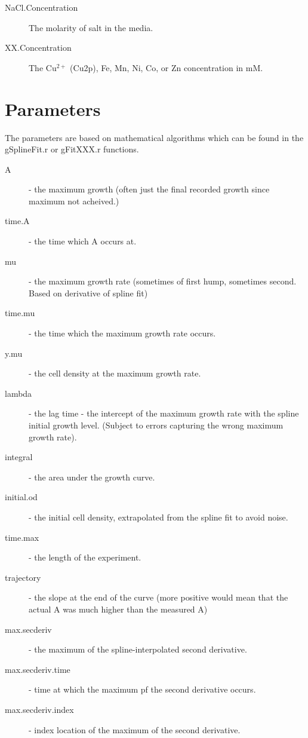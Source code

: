 \documentclass[11pt]{article}
\newcommand{\inlex}[1]{\ttfamily\small{#1}\rmfamily}
\begin{document}
\begin{description}
\item[NaCl.Concentration] The molarity of salt in the media. 

\item[XX.Concentration] The Cu$^{2+}$ (Cu2p), Fe, Mn, Ni, Co, or Zn concentration in mM.

\end{description}


\section{Parameters}
The parameters are based on mathematical algorithms which can be found in the \inlex{gSplineFit.r} or \inlex{gFitXXX.r} functions. 

\begin{description}
\item[A] - the maximum growth (often just the final recorded growth since maximum not acheived.)
\item[time.A] - the time which A occurs at.
\item[mu] - the maximum growth rate (sometimes of first hump, sometimes second. Based on derivative of spline fit)
\item[time.mu] - the time which the maximum growth rate occurs.
\item[y.mu] - the cell density at the maximum growth rate.
\item[lambda] - the lag time - the intercept of the maximum growth rate with the spline initial growth level. (Subject to errors capturing the wrong maximum growth rate).
\item[integral] - the area under the growth curve.
\item[initial.od] - the initial cell density, extrapolated from the spline fit to avoid noise.
\item[time.max] - the length of the experiment.
\item[trajectory] - the slope at the end of the curve (more positive would mean that the actual A was much higher than the measured A)
\item[max.secderiv] - the maximum of the spline-interpolated second derivative.
\item[max.secderiv.time] - time at which the maximum pf the second derivative occurs.
\item[max.secderiv.index] - index location of the maximum of the second derivative.
\end{description}


\end{document}
